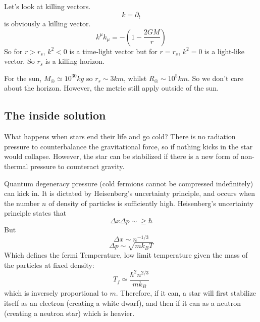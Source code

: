 \documentclass[a4paper]{book}
\theoremstyle{definition}
\theoremstyle{remark}
\begin{document}
Let's look at killing vectors. 
\begin{equation}
    k = \partial_t
\end{equation}
is obviously a killing vector. 
\begin{equation}
    k^\mu k_\mu = -(1-\frac{2GM}{r})
\end{equation}
So for $r>r_s$, $k^2 < 0$ is a time-light vector but for $r=r_s$, $k^2 = 0$ is a light-like vector. So $r_s$ is a killing horizon. \par \medskip 

For the sun, $M_\circledcirc \simeq 10^30 kg$ so $r_s\sim 3km$, whilst $R_\circledcirc \sim10^5km$. So we don't care about the horizon. However, the metric still apply outside of the sun. \par \medskip 

\subsection{The inside solution}

What happens when stars end their life and go cold? There is no radiation pressure to counterbalance the gravitational force, so if nothing kicks in the star would collapse. However, the star can be stabilized if there is a new form of non-thermal pressure to counteract gravity.  \par \medskip 

Quantum degeneracy pressure (cold fermions cannot be compressed indefinitely) can kick in. It is dictated by Heisenberg's uncertainty principle, and occurs when the number $n$ of density of particles is sufficiently high. Heisenberg's uncertainty principle states that 
\begin{equation}
    \Delta x \Delta p \sim \geq \hbar
\end{equation}
But 
\begin{equation}
    \Delta x \sim n^{-1/3}
\end{equation}
\begin{equation}
    \Delta p \sim \sqrt{mk_BT}
\end{equation}
Which defines the fermi Temperature, low limit temperature given the mass of the particles at fixed density:
\begin{equation}
    T_f \simeq \frac{\hbar^2 n^{2/3}}{mk_B}
\end{equation}
which is inversely proportional to $m$. Therefore, if it can, a star will first stabilize itself as an electron (creating a white dwarf), and then if it can as a neutron (creating a neutron star) which is heavier. \par \medskip 
\end{document}
